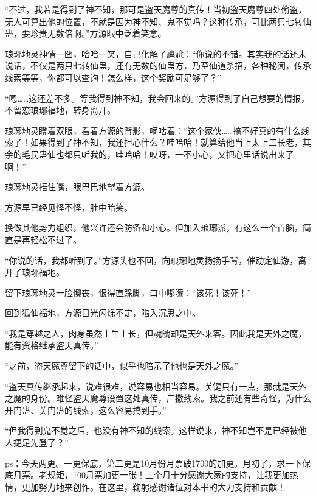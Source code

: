 \begin{this_body}
“不过，我若是得到了神不知，那可是盗天魔尊的真传！当初盗天魔尊四处偷盗，无人可算出他的位置，不就是因为神不知、鬼不觉吗？这种传承，可比两只七转仙蛊，要珍贵无数倍啊。”方源眼中泛着笑意。

琅琊地灵神情一囧，哈哈一笑，自己化解了尴尬：“你说的不错。其实我的话还未说话，不仅是两只七转仙蛊，还有无数的仙蛊方，乃至仙道杀招，各种秘闻，传承线索等等，你都可以查询！怎么样，这个奖励可足够了？”

“嗯……这还差不多。等我得到神不知，我会回来的。”方源得到了自己想要的情报，不留恋琅琊福地，转身离开。

琅琊地灵瞪着双眼，看着方源的背影，嘀咕着：“这个家伙……搞不好真的有什么线索了！如果得到了神不知，我还担心什么？哇哈哈！就算给他当上太上二长老，其余的毛民蛊仙也都只听我的，哇哈哈！哎呀，一不小心，又把心里话说出来了啊！”

琅琊地灵捂住嘴，眼巴巴地望着方源。

方源早已经见怪不怪，肚中暗笑。

换做其他势力组织，他兴许还会防备和小心。但加入琅琊派，有这么一个首脑，简直是再轻松不过了。

“你说的话，我都听到了。”方源头也不回，向琅琊地灵扬扬手背，催动定仙游，离开了琅琊福地。

留下琅琊地灵一脸懊丧，恨得直跺脚，口中嘟囔：“该死！该死！”

回到狐仙福地，方源目光闪烁不定，陷入沉思之中。

“我是穿越之人，肉身虽然土生土长，但魂魄却是天外来客。因此我是天外之魔，能有资格继承盗天真传。”

“之前，盗天魔尊留下的话中，似乎也暗示了他也是天外之魔。”

“盗天真传继承起来，说难很难，说容易也相当容易。关键只有一点，那就是天外之魔的身份。难怪盗天魔尊设置这处真传，广撒线索。我之前还有些奇怪，为什么开门蛊、关门蛊的线索，这么容易搞到手。”

“但我得到鬼不觉之后，也没有神不知的线索。这样说来，神不知岂不是已经被他人捷足先登了？”

ps：今天两更。一更保底，第二更是10月份月票破1700的加更。月初了，求一下保底月票。老规矩，100月票加更一张！上个月十分感谢大家的支持，让我更加热情，更加努力地来创作。在这里，鞠躬感谢诸位对本书的大力支持和贡献！

\end{this_body}

